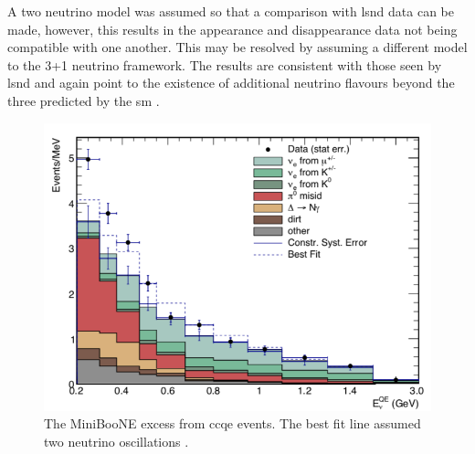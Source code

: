 A two neutrino model was assumed so that a comparison with \gls{lsnd} data can be made, however, this results in the appearance and disappearance data not being compatible with one another. This may be resolved by assuming a different model to the 3+1 neutrino framework. The results are consistent with those seen by \gls{lsnd} and again point to the existence of additional neutrino flavours beyond the three predicted by the \gls{sm} \cite{MiniBooNE_excess}. 
\begin{figure}[h!]
    \centering
    \includegraphics[width = \largefigwidth]{figures-chap2/MiniBooNE_excess.png}
    \caption[MiniBooNE excess.]{The MiniBooNE excess from \nue \gls{ccqe} events. The best fit line assumed two neutrino oscillations \cite{MiniBooNE_excess}.}
    \label{fig:MiniBooNE excess}
\end{figure}
\newpage

